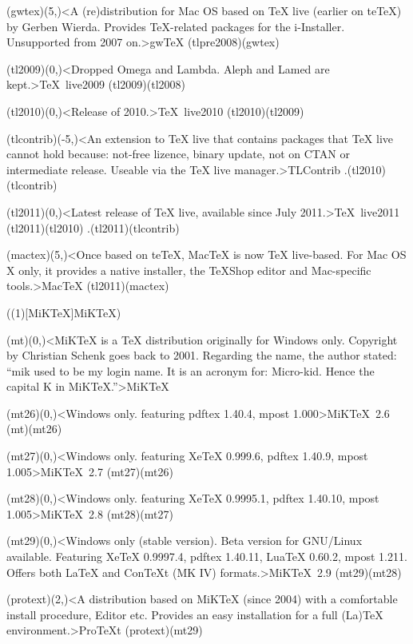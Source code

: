 {	\tonode[\histdistro](gwtex)(5,\layer)<A (re)distribution for Mac OS based on TeX live (earlier on teTeX) by Gerben Wierda. Provides TeX-related packages for the i-Installer. Unsupported from 2007 on.>{gw\TeX}
	\todraw(tlpre2008)(gwtex)

	\steplayer

	\tonode(tl2009)(0,\layer)<Dropped Omega and Lambda. Aleph and Lamed are kept.>{\TeX\ live2009}
	\todraw(tl2009)(tl2008)
	\steplayer

	\tonode(tl2010)(0,\layer)<Release of 2010.>{\TeX\ live2010}
	\todraw(tl2010)(tl2009)


	\tonode(tlcontrib)(-5,\layer)<An extension to TeX live that contains packages that TeX live cannot hold because: not-free lizence, binary update, not on CTAN or intermediate release. Useable via the TeX live manager.>{TLContrib}
	\todraw.(tl2010)(tlcontrib)
	\steplayer

	\tonode(tl2011)(0,\layer)<Latest release of TeX live, available since July 2011.>{\TeX\ live2011}
	\todraw(tl2011)(tl2010)
	\todraw.(tl2011)(tlcontrib)

	\tonode(mactex)(5,\layer)<Once based on teTeX, MacTeX is now TeX live-based. For Mac OS X only, it provides a native installer, the TeXShop editor and Mac-specific tools.>{Mac\TeX}
	\todraw(tl2011)(mactex)
}

\tograph(\tostruct(1)[MiK\TeX]{MiK\TeX}){
	\tonode(mt)(0,\layer)<MiKTeX is a TeX distribution originally for Windows only. Copyright by Christian Schenk goes back to 2001. Regarding the name, the author stated: “mik used to be my login name. It is an acronym for: Micro-kid. Hence the capital K in MiKTeX.”>{MiK\TeX}
	\steplayer

	\tonode(mt26)(0,\layer)<Windows only. featuring  pdftex 1.40.4, mpost 1.000>{MiK\TeX\ 2.6}
	\todraw(mt)(mt26)
	\steplayer

	\tonode(mt27)(0,\layer)<Windows only. featuring  XeTeX 0.999.6, pdftex 1.40.9, mpost 1.005>{MiK\TeX\ 2.7}
	\todraw(mt27)(mt26)
	\steplayer

	\tonode(mt28)(0,\layer)<Windows only. featuring  XeTeX 0.9995.1, pdftex 1.40.10, mpost 1.005>{MiK\TeX\ 2.8}
	\todraw(mt28)(mt27)
	\steplayer

	\tonode(mt29)(0,\layer)<Windows only (stable version). Beta version for GNU/Linux available. Featuring XeTeX 0.9997.4, pdftex 1.40.11, LuaTeX 0.60.2, mpost 1.211. Offers both LaTeX and ConTeXt (MK IV) formats.>{MiK\TeX\ 2.9}
	\todraw(mt29)(mt28)
	\steplayer	
	
	\tonode(protext)(2,\layer)<A distribution based on MiKTeX (since 2004) with a comfortable install procedure, Editor etc. Provides an easy installation for a full (La)TeX environment.>{ProTeXt}
	\todraw(protext)(mt29)
}

